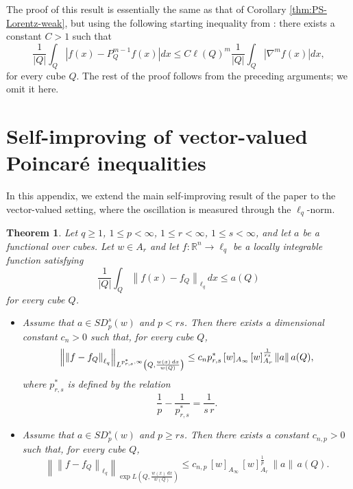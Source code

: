 \documentclass[reqno, 10pt, oneside]{amsart}
\numberwithin{equation}{section}
\newcommand{\strt}[1]{\rule{0pt}{#1}}
\newtheorem{theorem}{Theorem}
\numberwithin{theorem}{section}
\newcommand{\R}{{\mathbb R}}
\newcommand{\norm}[1]{\left\|#1\right\|}
\newcommand{\1}{{\rm 1\hspace*{-0.4ex}%
\rule{0.1ex}{1.52ex}\hspace*{0.2ex}}}
\begin{document}
The proof of this result is essentially the same as that of Corollary \ref{thm:PS-Lorentz-weak}, but using the following starting inequality from \cite{B}: there exists a constant $C>1$ such that
\begin{equation*}
	\frac{1}{|Q|}\int_Q |f(x)-P_Q^{m-1} f(x)| dx\le C \ell(Q)^{m} \frac{1}{|Q|} \int_Q |\nabla^{m} f (x)|dx ,
\end{equation*}
	for every cube $Q$. The rest of the proof follows from the preceding arguments; we omit it here.

\section{Self-improving of vector-valued Poincaré inequalities}\label{S vector}

In this appendix, we extend the main self-improving result of the paper to the vector-valued setting, where the oscillation is measured through the $\ell_q$-norm.

 


\begin{theorem}{\label{Appendix B}}
	Let $q\ge 1$, $1 \le p < \infty$, $1 \le r < \infty$, $1\le s<\infty$, and let $a$ be a functional over cubes. Let $w\in A_r$ and let $f:\R^n \longrightarrow \ell_q$ be a locally integrable function satisfying
	\begin{equation*}
		\frac{1}{|Q|}\int_Q \norm{f(x)-f_Q}_{\ell_q}\,dx \le a(Q)
	\end{equation*}
	for every cube $Q$.
	
	\begin{itemize}
		\item Assume that $a\in SD_p^s(w)$ and $p<rs$. Then there exists a dimensional constant $c_n>0$ such that, for every cube $Q$,
		\begin{equation*}
			\norm{\norm{f-f_Q}_{\ell_q}}_{\strt{2.3ex} L^{p_{r,s}^{*},\infty}\left(Q, \frac{w(x)\,dx}{w(Q)}\right)}
			\le
			c_n p_{r,s}^{*}\,[w]_{A_\infty}\,[w]_{A_r}^{\frac{1}{rs}}\,
			\|a\|\,a(Q),
		\end{equation*}
		where $p_{r,s}^{*}$ is defined by the relation
		\begin{equation*}
			\frac{1}{p}-\frac{1}{p_{r,s}^{*}}=\frac{1}{s\,r}.
		\end{equation*}
		
		\item Assume that $a\in SD_p^s(w)$ and $p\ge rs$. Then there exists a constant $c_{n,p}>0$ such that, for every cube $Q$,
		\begin{equation*}
			\norm{\norm{f-f_Q}_{\ell_q}}_{\exp L\left(Q,\frac{w(x)\,dx}{w(Q)}\right)}
			\le
			c_{n,p}\,[w]_{A_\infty}\,[w]_{A_r}^{\frac1p}\,
			\|a\|\,a(Q).
		\end{equation*}
	\end{itemize}
\end{theorem}
\end{document}
